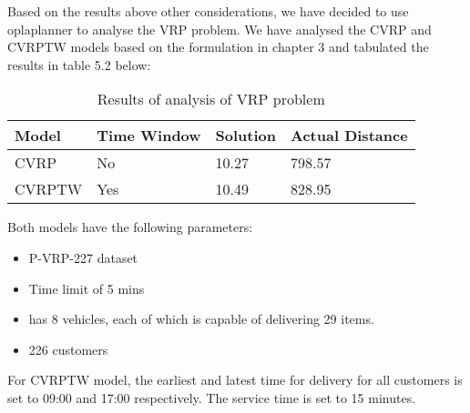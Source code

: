 \begin{table}[!ht]
\begin{center}
\begin{tabular}{|l|l|l|l|l|l|l|}
                                                                                         &                                &                         &                          &                         &                              &                         \\ \hline
\end{tabular}
\end{center}
\end{table}

Based on the results above other considerations, we have decided to use oplaplanner to analyse the VRP problem.
We have analysed the CVRP and CVRPTW models based on the formulation in chapter 3 and tabulated the results in
table 5.2 below:
\begin{table}[!ht]
\centering
\begin{tabular}{|l|l|l|l|}
\hline
Model  & Time Window & Solution & Actual Distance \\ \hline
CVRP   & No          & 10.27   & 798.57\\ \hline
CVRPTW & Yes         & 10.49   & 828.95\\ \hline
\end{tabular}
\caption{Results of analysis of VRP problem}
\label{my-label}
\end{table}
Both models have the following parameters:
\begin{itemize}
\item P-VRP-227 dataset
\item Time limit of 5 mins
\item has 8 vehicles, each of which is capable of delivering 29 items.
\item 226 customers
\end{itemize}

For CVRPTW model, the earliest and latest time for delivery for all customers is set to 09:00 and 17:00 respectively. The
service time is set to 15 minutes.

